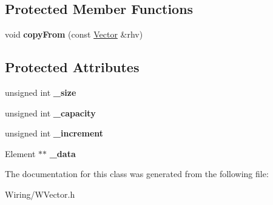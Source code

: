 \subsection*{Protected Member Functions}
\begin{DoxyCompactItemize}
\item 
\hypertarget{class_vector_a6cf4494b4229e1c3af9d02ad64999ada}{}void {\bfseries copy\+From} (const \hyperlink{class_vector}{Vector} \&rhv)\label{class_vector_a6cf4494b4229e1c3af9d02ad64999ada}

\end{DoxyCompactItemize}
\subsection*{Protected Attributes}
\begin{DoxyCompactItemize}
\item 
\hypertarget{class_vector_abecb458af946f2f33d167dbe76bd0f7f}{}unsigned int {\bfseries \+\_\+size}\label{class_vector_abecb458af946f2f33d167dbe76bd0f7f}

\item 
\hypertarget{class_vector_a747cd2bdd84fcbcdc7084ea503cd2852}{}unsigned int {\bfseries \+\_\+capacity}\label{class_vector_a747cd2bdd84fcbcdc7084ea503cd2852}

\item 
\hypertarget{class_vector_af4bb905b338bc53d64e1e94863647c75}{}unsigned int {\bfseries \+\_\+increment}\label{class_vector_af4bb905b338bc53d64e1e94863647c75}

\item 
\hypertarget{class_vector_aaa73e11c26fd3eb40c62fcdab0afff44}{}Element $\ast$$\ast$ {\bfseries \+\_\+data}\label{class_vector_aaa73e11c26fd3eb40c62fcdab0afff44}

\end{DoxyCompactItemize}


The documentation for this class was generated from the following file\+:\begin{DoxyCompactItemize}
\item 
Wiring/W\+Vector.\+h\end{DoxyCompactItemize}
